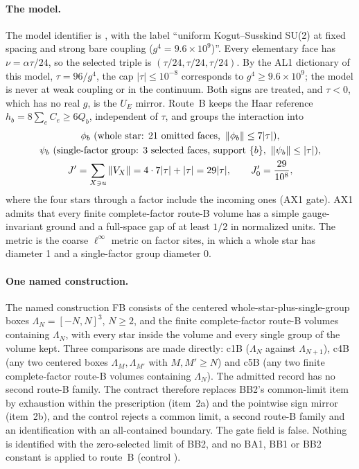 \paragraph{The model.} The model identifier is
, with the label ``uniform Kogut--Susskind SU(2) at
fixed spacing and strong bare coupling ($g^4=9.6\times10^9$)''. Every
elementary face has $\nu=\alpha\tau/24$, so the selected triple is
$(\tau/24,\tau/24,\tau/24)$. By the AL1 dictionary of this model,
$\tau=96/g^4$, the cap $|\tau|\le10^{-8}$ corresponds to $g^4\ge9.6\times10^9$;
the model is never at weak coupling or in the continuum. Both signs are
treated, and $\tau<0$, which has no real $g$, is the $U_E$ mirror. Route~B
keeps the Haar reference $h_b=8\sum_eC_e\ge6Q_b$, independent of $\tau$, and
groups the interaction into
\begin{equation}
 \begin{gathered}
 \phi_b\ \text{(whole star: 21 omitted faces, }\norm{\phi_b}\le7|\tau|),\\
 \psi_b\ \text{(single-factor group: 3 selected faces, support }\{b\},\ \norm{\psi_b}\le|\tau|),\\
 J'=\sum_{X\ni u}\norm{V_X}=4\cdot7|\tau|+|\tau|=29|\tau|,\qquad J_0'=\frac{29}{10^8},
 \end{gathered}
 \label{eq:bc2-grouping}
\end{equation}
where the four stars through a factor include the incoming ones (AX1 gate).
AX1 admits that every finite complete-factor route-B volume has a simple
gauge-invariant ground and a full-space gap of at least $1/2$ in normalized
units. The metric is the coarse $\ell^\infty$ metric on factor sites, in
which a whole star has diameter 1 and a single-factor group diameter 0.

\paragraph{One named construction.} The named construction FB consists of the
centered whole-star-plus-single-group boxes $\Lambda_N=[-N,N]^3$, $N\ge2$, and
the finite complete-factor route-B volumes containing $\Lambda_N$, with every
star inside the volume and every single group of the volume kept. Three
comparisons are made directly: c1B ($\Lambda_N$ against $\Lambda_{N+1}$), c4B
(any two centered boxes $\Lambda_M,\Lambda_{M'}$ with $M,M'\ge N$) and c5B (any
two finite complete-factor route-B volumes containing $\Lambda_N$). The
admitted record has no second route-B family. The contract therefore
replaces BB2's common-limit item by exhaustion within the prescription
(item~2a) and the pointwise sign mirror (item~2b), and the control
 rejects a common limit, a second route-B
family and an identification with an all-contained boundary. The gate field
 is false. Nothing is identified with the
zero-selected limit of BB2, and no BA1, BB1 or BB2 constant is applied to
route~B (control ).

